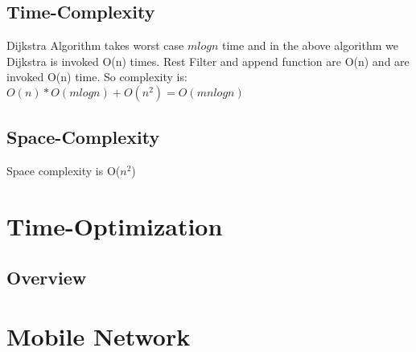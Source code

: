 \documentclass{article}
\begin{document}
\subsection{Time-Complexity}
Dijkstra Algorithm takes worst case $mlogn$ time and in the above algorithm we Dijkstra is invoked O(n) times. 
Rest Filter and append function are O(n) and are invoked O(n) time. So complexity is: \\
\hspace*{1.5cm}$O(n)*O(mlogn) + O(n^2) = O(mnlogn)$

\subsection{Space-Complexity}
Space complexity is O($n^2$)

\section{Time-Optimization}
\subsection{Overview}



\section{Mobile Network}
\end{document}
